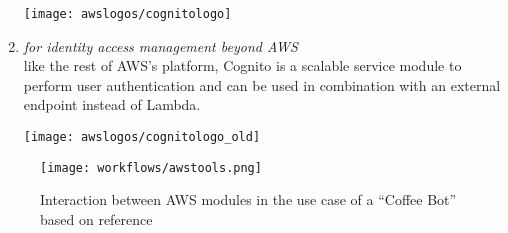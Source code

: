 \begin{enumerate}
	
	\begin{restoretext}
\begin{flushright}
	\texttt{[image: awslogos/cognitologo]}
\end{flushright}
	\end{restoretext}


	\item[\href{https://aws.amazon.com/cognito/}{\textbf{Cognito}} \footnote{\url{https://aws.amazon.com/cognito}}]
	\textit{for identity access management beyond AWS}\\
	like the rest of AWS's platform, Cognito is a scalable service module to perform user authentication and can be used in combination with an external endpoint instead of Lambda.
	
		\begin{restoretext}
\begin{flushright}
	\texttt{[image: awslogos/cognitologo\_old]}
\end{flushright}
	\end{restoretext}
	
\end{enumerate}


\begin{figure}[h]
	\caption{Interaction between AWS modules in the use case of a ``Coffee Bot'' based on reference \cite{aws:lex_webinar} }\label{lex_interactionExample}
	\centering
	\texttt{[image: workflows/awstools.png]}
\end{figure}
%

